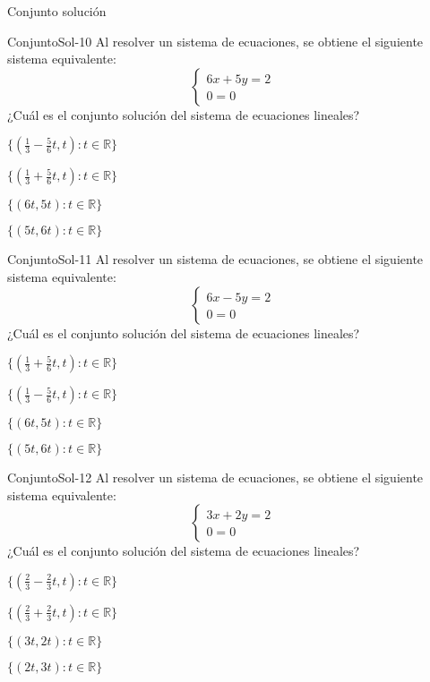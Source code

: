 \documentclass[a4,11pt]{aleph-notas}
\begin{document}
\begin{quiz}{Conjunto solución}
\begin{multi}[]%
    {ConjuntoSol-10}
    Al resolver un sistema de ecuaciones, se obtiene el siguiente sistema equivalente:
    \[
        \begin{cases}
            6x + 5y = 2 \\
            0 = 0
        \end{cases}
    \]
    ¿Cuál es el conjunto solución del sistema de ecuaciones lineales?
    \item* $\{(\frac{1}{3}-\frac{5}{6}t, t) : t\in \mathbb{R}\}$
    \item $\{(\frac{1}{3}+\frac{5}{6}t, t) : t\in \mathbb{R}\}$
    \item $\{(6t,5t) : t\in \mathbb{R}\}$
    \item $\{(5t,6t) : t\in \mathbb{R}\}$
\end{multi}

\begin{multi}[]%
    {ConjuntoSol-11}
    Al resolver un sistema de ecuaciones, se obtiene el siguiente sistema equivalente:
    \[
        \begin{cases}
            6x - 5y = 2 \\
            0 = 0
        \end{cases}
    \]
    ¿Cuál es el conjunto solución del sistema de ecuaciones lineales?
    \item* $\{(\frac{1}{3}+\frac{5}{6}t, t) : t\in \mathbb{R}\}$
    \item $\{(\frac{1}{3}-\frac{5}{6}t, t) : t\in \mathbb{R}\}$
    \item $\{(6t,5t) : t\in \mathbb{R}\}$
    \item $\{(5t,6t) : t\in \mathbb{R}\}$
\end{multi}

\begin{multi}[]%
    {ConjuntoSol-12}
    Al resolver un sistema de ecuaciones, se obtiene el siguiente sistema equivalente:
    \[
        \begin{cases}
            3x + 2y = 2 \\
            0 = 0
        \end{cases}
    \]
    ¿Cuál es el conjunto solución del sistema de ecuaciones lineales?
    \item* $\{(\frac{2}{3}-\frac{2}{3}t, t) : t\in \mathbb{R}\}$
    \item $\{(\frac{2}{3}+\frac{2}{3}t, t) : t\in \mathbb{R}\}$
    \item $\{(3t,2t) : t\in \mathbb{R}\}$
    \item $\{(2t,3t) : t\in \mathbb{R}\}$
\end{multi}


\end{quiz}
\end{document}
